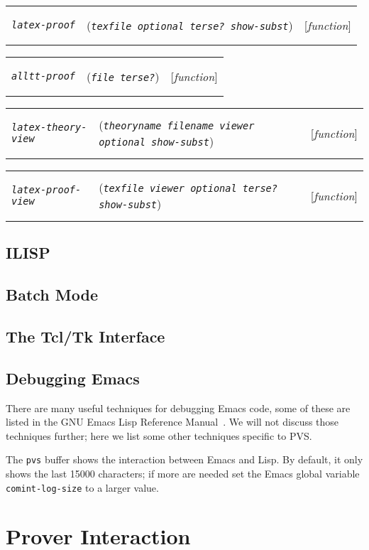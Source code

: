 \documentclass[12pt]{book}
\makeatletter
\def\ampoptional{{\smaller\sc {\smaller\smaller \&}optional\ }}
\newenvironment{function}[3]%
{\par\noindent\begin{boxedminipage}{\textwidth}%
 \par\noindent\begin{tabularx}{\linewidth}{l>{\raggedright}Xr}%
 \functionhtgt{#1}&(\texttt{\textit{#2}})&[\emph{#3}]%
 \end{tabularx}\par\flushright\begin{minipage}{.97\textwidth}}
{\end{minipage}\end{boxedminipage}}
\newcommand{\functionnm}[1]{\texttt{\textit{#1}}}
\newcommand{\functionhtgt}[1]{\hypertarget{#1}{\functionnm{#1}}\index{#1@\functionnm{#1}|underline}}
\newenvironment{lispfunction}[2]%
{\begin{function}{#1}{#2}{function}}{\end{function}}
\newcommand{\globalnm}[1]{\texttt{\textup{#1}}}
\makeatother
\begin{document}
\begin{lispfunction}{latex-proof}{texfile \ampoptional terse? show-subst}
\end{lispfunction}

\begin{lispfunction}{alltt-proof}{file terse?}
\end{lispfunction}

\begin{lispfunction}{latex-theory-view}
  {theoryname filename viewer \ampoptional show-subst}
\end{lispfunction}

\begin{lispfunction}{latex-proof-view}
  {texfile viewer \ampoptional terse? show-subst}
\end{lispfunction}

\subsection{ILISP}

\subsection{Batch Mode}

\subsection{The Tcl/Tk Interface}
\label{tcl-tk-interface}

\subsection{Debugging Emacs}

There are many useful techniques for debugging Emacs code, some of these
are listed in the GNU Emacs Lisp Reference Manual~\cite{Elisp}.  We will
not discuss those techniques further; here we list some other techniques
specific to PVS.

The \texttt{pvs} buffer shows the interaction between Emacs and Lisp.  By
default, it only shows the last 15000 characters; if more are needed set
the Emacs global variable \globalnm{comint-log-size} to a larger value.



\section{Prover Interaction}
\label{prover-interaction}
\end{document}
